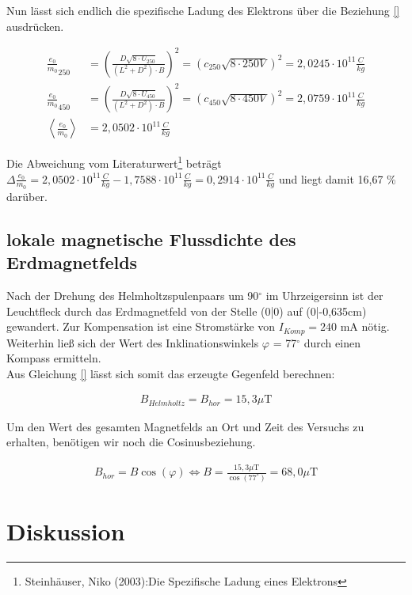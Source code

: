 Nun lässt sich endlich die spezifische Ladung des Elektrons über die Beziehung \eqref{} ausdrücken.

\begin{align}
\nonumber
\frac{e_0}{m_0}_{250} &= \left( \frac{D \sqrt{8\cdot U_{250}}}{(L^2+D^2)\cdot B} \right)^2 = (c_{250} \sqrt{8\cdot 250 V})^2 = 2,0245 \cdot 10^{11} \frac{C}{kg} \\
 \nonumber
 \frac{e_0}{m_0}_{450} &= \left( \frac{D \sqrt{8\cdot U_{450}}}{(L^2+D^2)\cdot B} \right)^2 = (c_{450} \sqrt{8\cdot 450 V})^2 = 2,0759 \cdot 10^{11} \frac{C}{kg} \\
 \left< \frac{e_0}{m_0} \right> &= 2,0502 \cdot 10^{11} \frac{C}{kg}
\end{align}

Die Abweichung vom Literaturwert\footnote{Steinhäuser, Niko (2003):Die Spezifische Ladung eines Elektrons} beträgt 
$\Delta \frac{e_0}{m_0} = 2,0502 \cdot 10^{11} \frac{C}{kg} - 1,7588 \cdot 10^{11} \frac{C}{kg} = 0,2914 \cdot 10^{11} \frac{C}{kg}$
und liegt damit 16,67 \% darüber.

\subsection{lokale magnetische Flussdichte des Erdmagnetfelds}
Nach der Drehung des Helmholtzspulenpaars um 90$^\circ$ im Uhrzeigersinn ist der Leuchtfleck durch das Erdmagnetfeld
von der Stelle (0|0) auf (0|-0,635cm) gewandert. Zur Kompensation ist eine Stromstärke von $I_{Komp} = 240$ mA nötig. 
Weiterhin ließ sich der Wert des Inklinationswinkels $\varphi$ = 77$^\circ$ durch einen Kompass ermitteln.\\
Aus Gleichung \eqref{} lässt sich somit das erzeugte Gegenfeld berechnen:

\begin{align}
 \nonumber
 B_{Helmholtz} = B_{hor}= 15,3 \mu\text{T}
 \end{align}
 
Um den Wert des gesamten Magnetfelds an Ort und Zeit des Versuchs zu erhalten, benötigen wir noch die Cosinusbeziehung.

\begin{align}
 B_{hor} = B \cos(\varphi) \Leftrightarrow B = \frac{15,3 \mu\text{T}}{\cos(77^\circ)} = 68,0 \mu\text{T}
\end{align}

\section{Diskussion}
